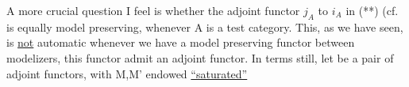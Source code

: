  A more crucial question I feel is whether the  adjoint functor
$j_{A}$ to $i_{A}$ in (**) (cf.   is equally model preserving, whenever A is a
test category. This, as we have seen, is \uline{not} automatic\unsure{,} whenever we
have a model preserving functor between modelizers,  this functor admit
an adjoint functor. In    terms  still, let
be a pair of adjoint functors, with M,M' endowed   \uline{``saturated''} 

